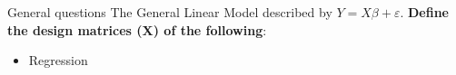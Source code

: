 \documentclass{beamer}
\begin{document}
\begin{frame}{General questions}   
  The General Linear Model described by $Y=X\beta+\varepsilon$. \textbf{Define the design matrices (X) of the following}:

  \begin{itemize}
    \item Regression
  \end{itemize}

\end{frame}
\end{document}
